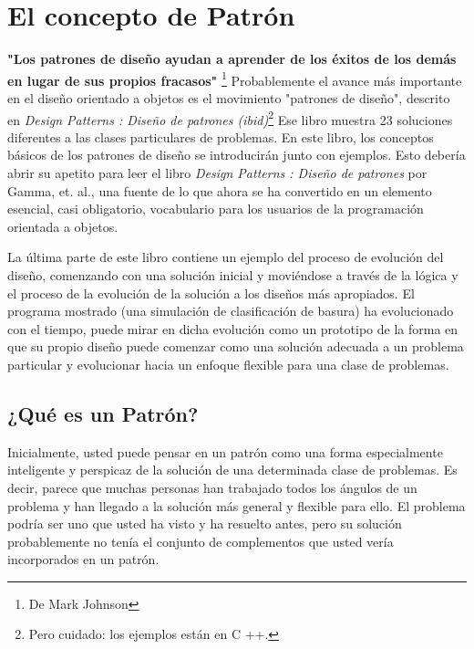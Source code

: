 \section*{El concepto de Patrón}
\label{sec:ecp}

\textbf{"Los patrones de diseño ayudan a aprender de los éxitos de los demás en lugar de sus propios fracasos"} \footnote{De Mark Johnson}
\newline
Probablemente el avance más importante en el diseño orientado a objetos es el movimiento "patrones de diseño", descrito en \textit{Design Patterns : Diseño de patrones (ibid)}\footnote{Pero cuidado: los ejemplos están en C ++.} Ese libro muestra 23 soluciones diferentes a las clases particulares de problemas. En este libro, los conceptos básicos de los patrones de diseño se introducirán junto con ejemplos. 
Esto debería abrir su apetito para leer el libro \textit{Design Patterns : Diseño de patrones} por Gamma, et. al., una fuente de lo que ahora se ha convertido en un elemento esencial, casi obligatorio, vocabulario para los usuarios de la programación orientada a objetos.\newline

La última parte de este libro contiene un ejemplo del proceso de evolución del diseño, comenzando con una solución inicial y moviéndose a través de la lógica y el proceso de la evolución de la solución a los diseños más apropiados. El programa mostrado (una simulación de clasificación de basura) ha evolucionado con el tiempo, puede mirar en dicha evolución como un prototipo de la forma en que su propio diseño puede comenzar como una solución adecuada a un problema particular  y evolucionar hacia un enfoque flexible para una clase de problemas.

\subsection*{¿Qué es un Patrón?}
\label{subsec:qeup}

Inicialmente, usted puede pensar en un patrón como una forma especialmente inteligente y perspicaz de la solución de una determinada clase de problemas. Es decir, parece que muchas personas han trabajado todos los ángulos de un problema y han llegado a la solución más general y flexible para ello. El problema podría ser uno que usted ha visto y ha resuelto antes, pero su solución probablemente no tenía el conjunto de complementos que usted vería incorporados en un patrón.    \newline


